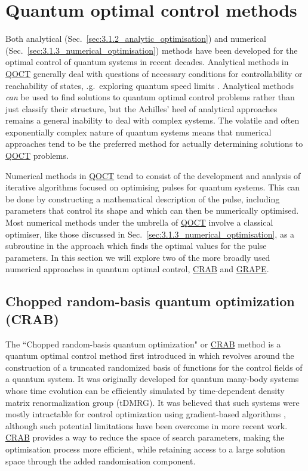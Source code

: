 \documentclass[a4paper,oneside,11pt]{book}
\newcommand{\acrref}[1]{\hyperref[acr:#1]{#1}}
\begin{document}
\section{Quantum optimal control methods}\label{sec:3.3_qoct_methods}

Both analytical (Sec.~\ref{sec:3.1.2_analytic_optimisation}) and numerical (Sec.~\ref{sec:3.1.3_numerical_optimisation}) methods have been developed for the optimal control of quantum systems in recent decades. Analytical methods in \acrref{QOCT} generally deal with questions of necessary conditions for controllability \cite{schirmer_complete_2001} or reachability of states, \@e.g.~exploring quantum speed limits \cite{khaneja_time_2001, hegerfeldt_driving_2013, poggi_quantum_2013}. Analytical methods \emph{can} be used to find solutions to quantum optimal control problems rather than just classify their structure, but the Achilles' heel of analytical approaches remains a general inability to deal with complex systems. The volatile and often exponentially complex nature of quantum systems means that numerical approaches tend to be the preferred method for actually determining solutions to \acrref{QOCT} problems. 

Numerical methods in \acrref{QOCT} tend to consist of the development and analysis of iterative algorithms focused on optimising pulses for quantum systems. This can be done by constructing a mathematical description of the pulse, including parameters that control its shape and which can then be numerically optimised. Most numerical methods under the umbrella of \acrref{QOCT} involve a classical optimiser, like those discussed in Sec.~\ref{sec:3.1.3_numerical_optimisation}, as a subroutine in the approach which finds the optimal values for the pulse parameters. In this section we will explore two of the more broadly used numerical approaches in quantum optimal control, \acrref{CRAB} and \acrref{GRAPE}. 

\subsection{Chopped random-basis quantum optimization (CRAB)}\label{sec:3.3.1_CRAB}

The ``Chopped random-basis quantum optimization" or \acrref{CRAB} method is a quantum optimal control method first introduced in \cite{doria_optimal_2011, caneva_chopped_2011} which revolves around the construction of a truncated randomized basis of functions for the control fields of a quantum system. It was originally developed for quantum many-body systems whose time evolution can be efficiently simulated by time-dependent density matrix renormalization group (tDMRG)\cite{white_density_1992, schollwock_density-matrix_2005, schollwock_density-matrix_2011}. It was believed that such systems were mostly intractable for control optimization using gradient-based algorithms \cite{brif_control_2010}, although such potential limitations have been overcome in more recent work\cite{jensen_approximate_2021}. \acrref{CRAB} provides a way to reduce the space of search parameters, making the optimisation process more efficient, while retaining access to a large solution space through the added randomisation component.
\end{document}
